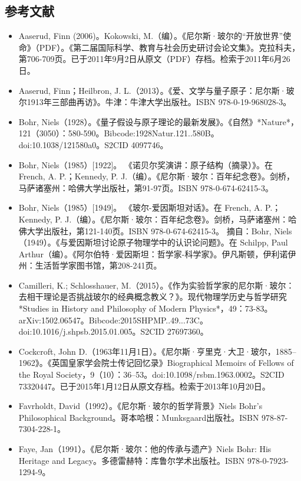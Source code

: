 \subsection{参考文献}
\begin{itemize}
\item Aaserud, Finn (2006)。Kokowski, M.（编）。《尼尔斯·玻尔的“开放世界”使命》（PDF）。《第二届国际科学、教育与社会历史研讨会论文集》。克拉科夫，第706-709页。已于2011年9月2日从原文（PDF）存档。检索于2011年6月26日。
\item Aaserud, Finn；Heilbron, J. L.（2013）。《爱、文学与量子原子：尼尔斯·玻尔1913年三部曲再访》。牛津：牛津大学出版社。ISBN 978-0-19-968028-3。
\item Bohr, Niels（1928）。《量子假设与原子理论的最新发展》。《自然》*Nature*，121（3050）：580-590。Bibcode:1928Natur.121..580B。doi:10.1038/121580a0。S2CID 4097746。
\item Bohr, Niels（1985）[1922]。 《诺贝尔奖演讲：原子结构（摘录）》。在 French, A. P.；Kennedy, P. J.（编）。《尼尔斯·玻尔：百年纪念卷》。剑桥，马萨诸塞州：哈佛大学出版社，第91-97页。ISBN 978-0-674-62415-3。
\item Bohr, Niels（1985）[1949]。 《玻尔-爱因斯坦对话》。在 French, A. P.；Kennedy, P. J.（编）。《尼尔斯·玻尔：百年纪念卷》。剑桥，马萨诸塞州：哈佛大学出版社，第121-140页。ISBN 978-0-674-62415-3。
摘自：Bohr, Niels（1949）。《与爱因斯坦讨论原子物理学中的认识论问题》。在 Schilpp, Paul Arthur（编）。《阿尔伯特·爱因斯坦：哲学家-科学家》。伊凡斯顿，伊利诺伊州：生活哲学家图书馆，第208-241页。
\item Camilleri, K.; Schlosshauer, M.（2015）。《作为实验哲学家的尼尔斯·玻尔：去相干理论是否挑战玻尔的经典概念教义？》。现代物理学历史与哲学研究*Studies in History and Philosophy of Modern Physics*，49：73-83。arXiv:1502.06547。Bibcode:2015SHPMP..49...73C。doi:10.1016/j.shpsb.2015.01.005。S2CID 27697360。
\item Cockcroft, John D.（1963年11月1日）。《尼尔斯·亨里克·大卫·玻尔，1885–1962》。《英国皇家学会院士传记回忆录》Biographical Memoirs of Fellows of the Royal Society，9（10）：36–53。doi:10.1098/rsbm.1963.0002。S2CID 73320447。已于2015年1月12日从原文存档。检索于2013年10月20日。
\item Favrholdt, David（1992）。《尼尔斯·玻尔的哲学背景》Niels Bohr's Philosophical Background。哥本哈根：Munksgaard出版社。ISBN 978-87-7304-228-1。
\item Faye, Jan（1991）。《尼尔斯·玻尔：他的传承与遗产》Niels Bohr: His Heritage and Legacy。多德雷赫特：库鲁尔学术出版社。ISBN 978-0-7923-1294-9。

\end{itemize}
